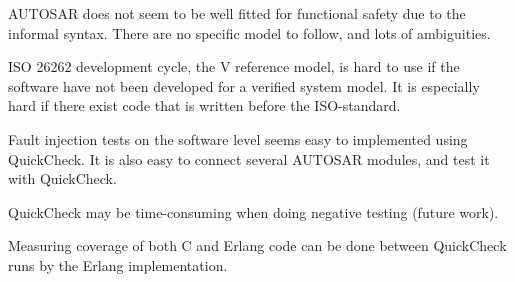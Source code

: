 AUTOSAR does not seem to be well fitted for functional safety due to
the informal syntax. There are no specific model to follow, and lots
of ambiguities.

ISO 26262 development cycle, the V reference model, is hard to use if
the software have not been developed for a verified system model. It
is especially hard if there exist code that is written before the
ISO-standard.

Fault injection tests on the software level seems easy to implemented
using QuickCheck. It is also easy to connect several AUTOSAR modules,
and test it with QuickCheck.

QuickCheck may be time-consuming when doing negative testing (future
work).

Measuring coverage of both C and Erlang code can be done between
QuickCheck runs by the Erlang implementation.
